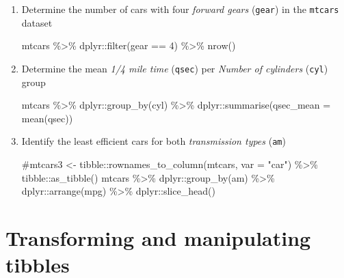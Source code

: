 \documentclass[
  letterpaper,
]{book}
\newenvironment{Shaded}{}{}
\newcommand{\AttributeTok}[1]{\textcolor[rgb]{0.84,0.23,0.29}{#1}}
\newcommand{\CommentTok}[1]{\textcolor[rgb]{0.42,0.45,0.49}{#1}}
\newcommand{\DecValTok}[1]{\textcolor[rgb]{0.00,0.36,0.77}{#1}}
\newcommand{\FunctionTok}[1]{\textcolor[rgb]{0.44,0.26,0.76}{#1}}
\newcommand{\NormalTok}[1]{\textcolor[rgb]{0.14,0.16,0.18}{#1}}
\newcommand{\SpecialCharTok}[1]{\textcolor[rgb]{0.00,0.36,0.77}{#1}}
\begin{document}
\begin{enumerate}
\def\labelenumi{\arabic{enumi}.}
\item
  Determine the number of cars with four \emph{forward gears}
  (\texttt{gear}) in the \texttt{mtcars} dataset

\begin{Shaded}
\begin{Highlighting}[]
\NormalTok{mtcars }\SpecialCharTok{\%\textgreater{}\%}\NormalTok{ dplyr}\SpecialCharTok{::}\FunctionTok{filter}\NormalTok{(gear }\SpecialCharTok{==} \DecValTok{4}\NormalTok{) }\SpecialCharTok{\%\textgreater{}\%} \FunctionTok{nrow}\NormalTok{()}
\end{Highlighting}
\end{Shaded}
\item
  Determine the mean \emph{1/4 mile time} (\texttt{qsec}) per
  \emph{Number of cylinders} (\texttt{cyl}) group

\begin{Shaded}
\begin{Highlighting}[]
\NormalTok{mtcars }\SpecialCharTok{\%\textgreater{}\%}\NormalTok{ dplyr}\SpecialCharTok{::}\FunctionTok{group\_by}\NormalTok{(cyl) }\SpecialCharTok{\%\textgreater{}\%}\NormalTok{ dplyr}\SpecialCharTok{::}\FunctionTok{summarise}\NormalTok{(}\AttributeTok{qsec\_mean =} \FunctionTok{mean}\NormalTok{(qsec))}
\end{Highlighting}
\end{Shaded}
\item
  Identify the least efficient cars for both \emph{transmission types}
  (\texttt{am})

\begin{Shaded}
\begin{Highlighting}[]
\CommentTok{\#mtcars3 \textless{}{-} tibble::rownames\_to\_column(mtcars, var = "car") \%\textgreater{}\% tibble::as\_tibble()}
\NormalTok{mtcars }\SpecialCharTok{\%\textgreater{}\%}\NormalTok{ dplyr}\SpecialCharTok{::}\FunctionTok{group\_by}\NormalTok{(am) }\SpecialCharTok{\%\textgreater{}\%}\NormalTok{ dplyr}\SpecialCharTok{::}\FunctionTok{arrange}\NormalTok{(mpg) }\SpecialCharTok{\%\textgreater{}\%}\NormalTok{ dplyr}\SpecialCharTok{::}\FunctionTok{slice\_head}\NormalTok{()}
\end{Highlighting}
\end{Shaded}
\end{enumerate}

\hypertarget{transforming-and-manipulating-tibbles}{%
\section{Transforming and manipulating
tibbles}\label{transforming-and-manipulating-tibbles}}
\end{document}
